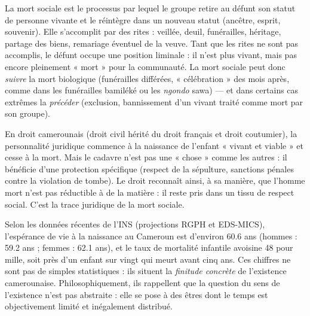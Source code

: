 \documentclass[11pt]{article}
\newcommand{\cle}[1]{{\popxbold\color{popdark}#1}}
\newcounter{popsec}
\newcounter{popsub}
\newcommand{\courssub}[1]{%
  \stepcounter{popsub}%
  \par\vspace{9pt}\noindent{\popxbold\fontsize{11.5}{13}\selectfont\color{popink}{\color{poporange}\thepopsec.\thepopsub}\hspace{6pt}#1}\par\nopagebreak\vspace{4pt}
}
\begin{document}
\begin{definition}
La \cle{mort sociale} est le processus par lequel le groupe retire au défunt son statut de personne vivante et le réintègre dans un nouveau statut (ancêtre, esprit, souvenir). Elle s'accomplit par des \cle{rites} : veillée, deuil, funérailles, héritage, partage des biens, remariage éventuel de la veuve. Tant que les rites ne sont pas accomplis, le défunt occupe une position liminale : il n'est plus vivant, mais pas encore pleinement « mort » pour la communauté. La mort sociale peut donc \emph{suivre} la mort biologique (funérailles différées, « célébration » des mois après, comme dans les funérailles bamiléké ou les \emph{ngondo} sawa) — et dans certains cas extrêmes la \emph{précéder} (exclusion, bannissement d'un vivant traité comme mort par son groupe).
\end{definition}

\begin{savaistu}
En droit camerounais (droit civil hérité du droit français et droit coutumier), la \cle{personnalité juridique} commence à la naissance de l'enfant « vivant et viable » et cesse à la mort. Mais le cadavre n'est pas une « chose » comme les autres : il bénéficie d'une protection spécifique (respect de la sépulture, sanctions pénales contre la violation de tombe). Le droit reconnaît ainsi, à sa manière, que l'homme mort n'est pas réductible à de la matière : il reste pris dans un tissu de respect social. C'est la trace juridique de la mort sociale.
\end{savaistu}

\begin{exemplebox}
Selon les données récentes de l'INS (projections RGPH et EDS-MICS), l'espérance de vie à la naissance au Cameroun est d'environ \num{60,6} ans (hommes : \num{59,2} ans ; femmes : \num{62,1} ans), et le taux de mortalité infantile avoisine \num{48} pour mille, soit près d'un enfant sur vingt qui meurt avant cinq ans. Ces chiffres ne sont pas de simples statistiques : ils situent la \emph{finitude concrète} de l'existence camerounaise. Philosophiquement, ils rappellent que la question du sens de l'existence n'est pas abstraite : elle se pose à des êtres dont le temps est objectivement limité et inégalement distribué.
\end{exemplebox}

\courssub{Synthèse : trois plans, trois seuils}
\end{document}
